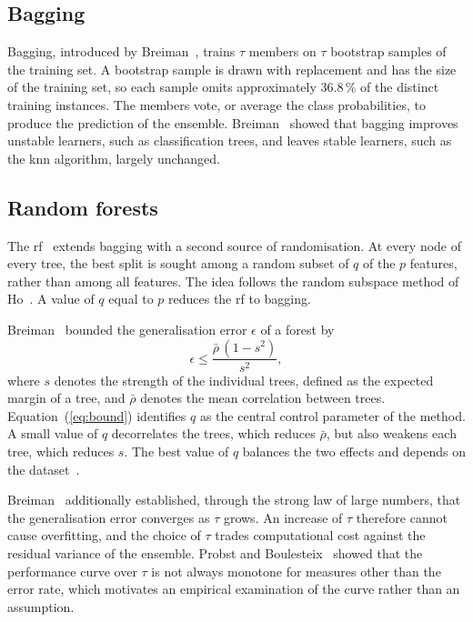 \subsection{Bagging}
\label{sec:bg-bagging}

Bagging, introduced by Breiman~\cite{breiman1996}, trains $\tau$ members on
$\tau$ bootstrap samples of the training set. A bootstrap sample is drawn
with replacement and has the size of the training set, so each sample omits
approximately $36.8\,\%$ of the distinct training instances. The members
vote, or average the class probabilities, to produce the prediction of the
ensemble. Breiman~\cite{breiman1996} showed that bagging improves unstable
learners, such as classification trees, and leaves stable learners, such as
the \gls{knn} algorithm, largely unchanged.

\subsection{Random forests}
\label{sec:bg-rf}

The \gls{rf}~\cite{breiman2001} extends bagging with a second source of
randomisation. At every node of every tree, the best split is sought among a
random subset of $q$ of the $p$ features, rather than among all features.
The idea follows the random subspace method of Ho~\cite{ho1998}. A value of
$q$ equal to $p$ reduces the \gls{rf} to bagging.

Breiman~\cite{breiman2001} bounded the generalisation error $\epsilon$ of a
forest by
\begin{equation}
\epsilon \leq \frac{\bar{\rho}\,(1 - s^2)}{s^2},
\label{eq:bound}
\end{equation}
where $s$ denotes the strength of the individual trees, defined as the
expected margin of a tree, and $\bar{\rho}$ denotes the mean correlation
between trees. Equation~(\ref{eq:bound}) identifies $q$ as the central
control parameter of the method. A small value of $q$ decorrelates the
trees, which reduces $\bar{\rho}$, but also weakens each tree, which reduces
$s$. The best value of $q$ balances the two effects and depends on the
dataset~\cite{probst2019}.

Breiman~\cite{breiman2001} additionally established, through the strong law
of large numbers, that the generalisation error converges as $\tau$ grows. An
increase of $\tau$ therefore cannot cause overfitting, and the choice of
$\tau$ trades computational cost against the residual variance of the
ensemble. Probst and Boulesteix~\cite{probst2018} showed that the performance
curve over $\tau$ is not always monotone for measures other than the error
rate, which motivates an empirical examination of the curve rather than an
assumption.

